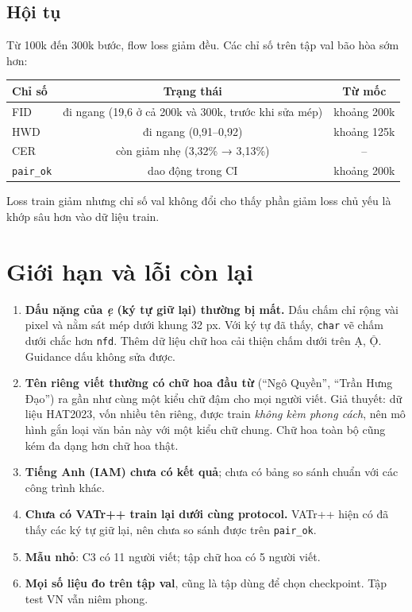 \documentclass[11pt,a4paper]{article}
\newcommand{\pairok}{\texttt{pair\_ok}}
\begin{document}
\subsection{Hội tụ}
Từ 100k đến 300k bước, flow loss giảm đều. Các chỉ số trên tập val bão hòa sớm hơn:

\begin{center}\small
\begin{tabular}{lcc}
\toprule
Chỉ số & Trạng thái & Từ mốc \\
\midrule
FID & đi ngang (19,6 ở cả 200k và 300k, trước khi sửa mép) & khoảng 200k \\
HWD & đi ngang (0,91--0,92) & khoảng 125k \\
CER & còn giảm nhẹ (3,32\% → 3,13\%) & -- \\
\pairok{} & dao động trong CI & khoảng 200k \\
\bottomrule
\end{tabular}
\end{center}

Loss train giảm nhưng chỉ số val không đổi cho thấy phần giảm loss chủ yếu là khớp sâu hơn vào dữ liệu train.

\FloatBarrier
\section{Giới hạn và lỗi còn lại}
\label{sec:limits}
\begin{enumerate}
\item \textbf{Dấu nặng của \emph{ẹ} (ký tự giữ lại) thường bị mất.} Dấu chấm chỉ rộng vài pixel và nằm sát mép dưới khung 32 px. Với ký tự đã thấy, \texttt{char} vẽ chấm dưới chắc hơn \texttt{nfd}. Thêm dữ liệu chữ hoa cải thiện chấm dưới trên Ạ, Ộ. Guidance dấu không sửa được.
\item \textbf{Tên riêng viết thường có chữ hoa đầu từ} (``Ngô Quyền'', ``Trần Hưng Đạo'') ra gần như cùng một kiểu chữ đậm cho mọi người viết. Giả thuyết: dữ liệu HAT2023, vốn nhiều tên riêng, được train \emph{không kèm phong cách}, nên mô hình gắn loại văn bản này với một kiểu chữ chung. Chữ hoa toàn bộ cũng kém đa dạng hơn chữ hoa thật.
\item \textbf{Tiếng Anh (IAM) chưa có kết quả}; chưa có bảng so sánh chuẩn với các công trình khác.
\item \textbf{Chưa có VATr++ train lại dưới cùng protocol.} VATr++ hiện có đã thấy các ký tự giữ lại, nên chưa so sánh được trên \pairok{}.
\item \textbf{Mẫu nhỏ}: C3 có 11 người viết; tập chữ hoa có 5 người viết.
\item \textbf{Mọi số liệu đo trên tập val}, cũng là tập dùng để chọn checkpoint. Tập test VN vẫn niêm phong.
\end{enumerate}
\end{document}
